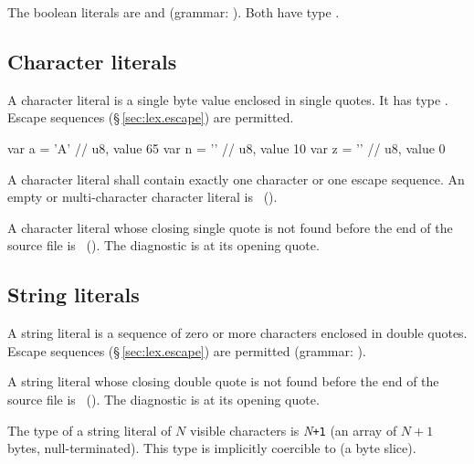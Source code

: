 \pnum
The boolean literals are  and  (grammar:
).  Both have type .

\subsection{Character literals}
\label{sec:lex.literals.char}

\pnum
A character literal is a single byte value enclosed in single quotes.  It
has type .  Escape sequences (\S\,\ref{sec:lex.escape}) are
permitted.

\begin{example}
\begin{laincode}
var a = 'A'    // u8, value 65
var n = '\n'   // u8, value 10
var z = '\0'   // u8, value 0
\end{laincode}
\end{example}

\begin{constraint}
  A character literal shall contain exactly one character or one escape
  sequence.  An empty or multi-character character literal is
  \illformed{}~().
\end{constraint}

\begin{constraint}
  A character literal whose closing single quote is not found before the
  end of the source file is \illformed{}~().  The diagnostic
  is at its opening quote.
\end{constraint}

\subsection{String literals}
\label{sec:lex.literals.string}

\pnum
A string literal is a sequence of zero or more characters enclosed in
double quotes.  Escape sequences (\S\,\ref{sec:lex.escape}) are permitted
(grammar: ).

\begin{constraint}
  A string literal whose closing double quote is not found before the end
  of the source file is \illformed{}~().  The diagnostic is
  at its opening quote.
\end{constraint}

\pnum
The type of a string literal of $N$ visible characters is
\textit{N}\texttt{+1} (an array of $N{+}1$ bytes,
null-terminated).  This type is implicitly coercible to  (a
byte slice).


